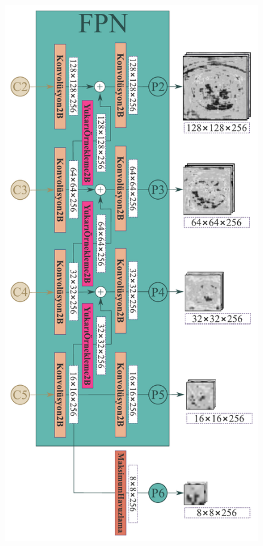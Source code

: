\begin{figure}[h!]
	\begin{center}
		\vspace{0.4cm}
		{
			\vspace{0.4cm}
			\includegraphics[scale=0.72]{Yapilan-Calismalar/Figures/feature_pyramid_network.pdf}
		}
	\end{center}
\end{figure}

